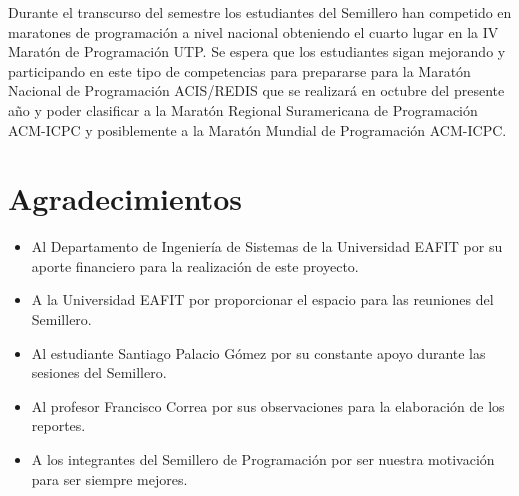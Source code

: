 \documentclass[conference]{IEEEtran}
\begin{document}
Durante el transcurso del semestre los estudiantes del Semillero han competido en maratones de programación a nivel nacional obteniendo el cuarto lugar en la IV Maratón de Programación UTP. Se espera que los estudiantes sigan mejorando y participando en este tipo de competencias para prepararse para la Maratón Nacional de Programación ACIS/REDIS que se realizará en octubre del presente año y poder clasificar a la Maratón Regional Suramericana de Programación ACM-ICPC y posiblemente a la Maratón Mundial de Programación ACM-ICPC.\\

\section{Agradecimientos}
\begin{itemize}
	\item Al Departamento de Ingeniería de Sistemas de la Universidad EAFIT por su aporte financiero para la realización de este proyecto.
	\item A la Universidad EAFIT por proporcionar el espacio para las reuniones del Semillero.
	\item Al estudiante Santiago Palacio Gómez por su constante apoyo durante las sesiones del Semillero.
	\item Al profesor Francisco Correa por sus observaciones para la elaboración de los reportes.
	\item A los integrantes del Semillero de Programación por ser nuestra motivación para ser siempre mejores.
\end{itemize}

\nocite{*}




\end{document}
